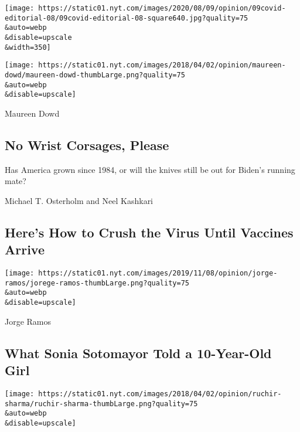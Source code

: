 \texttt{[image: https://static01.nyt.com/images/2020/08/09/opinion/09covid-editorial-08/09covid-editorial-08-square640.jpg?quality=75\\\&auto=webp\\\&disable=upscale\\\&width=350]}

\href{/2020/08/08/opinion/sunday/biden-vice-president-geraldine-ferraro.html}{}

\texttt{[image: https://static01.nyt.com/images/2018/04/02/opinion/maureen-dowd/maureen-dowd-thumbLarge.png?quality=75\\\&auto=webp\\\&disable=upscale]}

Maureen Dowd

\hypertarget{no-wrist-corsages-please}{%
\subsection{No Wrist Corsages, Please}\label{no-wrist-corsages-please}}

Has America grown since 1984, or will the knives still be out for
Biden's running mate?

\href{/2020/08/07/opinion/coronavirus-lockdown-unemployment-death.html}{}

Michael T. Osterholm and Neel Kashkari

\hypertarget{heres-how-to-crush-the-virus-until-vaccines-arrive}{%
\subsection{Here's How to Crush the Virus Until Vaccines
Arrive}\label{heres-how-to-crush-the-virus-until-vaccines-arrive}}

\href{/2020/08/07/opinion/latina-women-politics.html}{}

\texttt{[image: https://static01.nyt.com/images/2019/11/08/opinion/jorge-ramos/jorege-ramos-thumbLarge.png?quality=75\\\&auto=webp\\\&disable=upscale]}

Jorge Ramos

\hypertarget{what-sonia-sotomayor-told-a-10-year-old-girl}{%
\subsection{What Sonia Sotomayor Told a 10-Year-Old
Girl}\label{what-sonia-sotomayor-told-a-10-year-old-girl}}

\href{/2020/08/08/opinion/gold-investment-coronavirus.html}{}

\texttt{[image: https://static01.nyt.com/images/2018/04/02/opinion/ruchir-sharma/ruchir-sharma-thumbLarge.png?quality=75\\\&auto=webp\\\&disable=upscale]}

